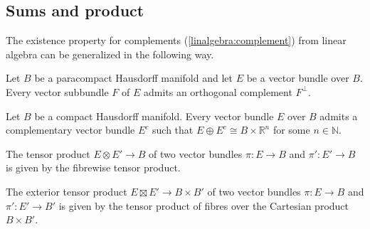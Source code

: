 \subsection{Sums and product}


    The existence property for complements (\cref{linalgebra:complement}) from linear algebra can be generalized in the following way.
    \begin{property}
        Let $B$ be a paracompact Hausdorff manifold and let $E$ be a vector bundle over $B$. Every vector subbundle $F$ of $E$ admits an orthogonal complement $F^\perp$.
    \end{property}
    \begin{property}\label{bundle:hausdorff}
        Let $B$ be a compact Hausdorff manifold. Every vector bundle $E$ over $B$ admits a complementary vector bundle $E^c$ such that $E\oplus E^c\cong B\times\mathbb{R}^n$ for some $n\in\mathbb{N}$.
    \end{property}


    \begin{definition}
        The tensor product $E\otimes E'\rightarrow B$ of two vector bundles $\pi:E\rightarrow B$ and $\pi':E'\rightarrow B$ is given by the fibrewise tensor product.
    \end{definition}
    \begin{definition}
        The exterior tensor product $E\boxtimes E'\rightarrow B\times B'$ of two vector bundles $\pi:E\rightarrow B$ and $\pi':E'\rightarrow B'$ is given by the tensor product of fibres over the Cartesian product $B\times B'$.
    \end{definition}

